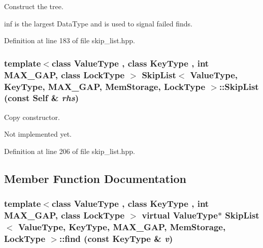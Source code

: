 Construct the tree. 

inf is the largest DataType and is used to signal failed finds. 

Definition at line 183 of file skip\_\-list.hpp.\hypertarget{classSkipList_3_01ValueType_00_01KeyType_00_01MAX__GAP_00_01MemStorage_00_01LockType_01_4_c7c90a05082f010951c52e7c5b508b24}{
\subsubsection[{SkipList}]{\setlength{\rightskip}{0pt plus 5cm}template$<$class ValueType , class KeyType , int MAX\_\-GAP, class LockType $>$ SkipList$<$ ValueType, KeyType, MAX\_\-GAP, MemStorage, LockType $>$::SkipList (const {\bf Self} \& {\em rhs})}}
\label{classSkipList_3_01ValueType_00_01KeyType_00_01MAX__GAP_00_01MemStorage_00_01LockType_01_4_c7c90a05082f010951c52e7c5b508b24}


Copy constructor. 

Not implemented yet. 

Definition at line 206 of file skip\_\-list.hpp.

\subsection{Member Function Documentation}
\hypertarget{classSkipList_3_01ValueType_00_01KeyType_00_01MAX__GAP_00_01MemStorage_00_01LockType_01_4_fb164870329e594f7e8ab87df47ff502}{
\subsubsection[{find}]{\setlength{\rightskip}{0pt plus 5cm}template$<$class ValueType , class KeyType , int MAX\_\-GAP, class LockType $>$ virtual ValueType$\ast$ SkipList$<$ ValueType, KeyType, MAX\_\-GAP, MemStorage, LockType $>$::find (const KeyType \& {\em v})}}
\label{classSkipList_3_01ValueType_00_01KeyType_00_01MAX__GAP_00_01MemStorage_00_01LockType_01_4_fb164870329e594f7e8ab87df47ff502}



